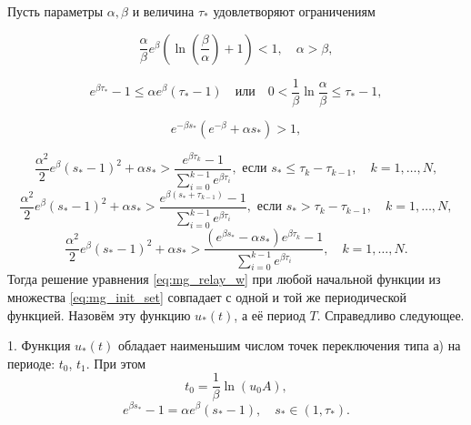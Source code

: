 \begin{theorem}
	\label{thm:mg_auxiliary_main}
	Пусть параметры $\alpha, \beta$ и величина $\tau_*$ удовлетворяют ограничениям
	
	\begin{equation}
		\label{eq:cond_thm1}
		\frac{\alpha}{\beta}e^{\beta}\left(\ln\left(\frac{\beta}{\alpha}\right)+1\right) < 1,
		\quad
		\alpha > \beta,
	\end{equation}
	
	\begin{equation}
		\label{eq:cond_thm2}
		e^{\beta \tau_*}-1 \leqslant \alpha e^\beta(\tau_*-1)
		\quad\text{или}\quad
		0 < \frac{1}{\beta}\ln\frac{\alpha}{\beta}\leqslant\tau_*-1,
	\end{equation}
	
	\begin{equation}
		\label{eq:cond_th_w>1_t_1+1}
		e^{-\beta s_*}(e^{-\beta}+\alpha s_*) > 1,
	\end{equation}
	
	\begin{equation}
		\label{eq:cond_hair_hair_01}
		\frac{\alpha^2}{2}e^\beta(s_*-1)^2+\alpha s_*>\frac{e^{\beta \tau_k}-1}{\sum_{i=0}^{k-1}e^{\beta \tau_i}},\text{ если } s_*\leqslant \tau_k-\tau_{k-1},\quad k=1,\ldots,N,
	\end{equation}
	\begin{equation}
		\label{eq:cond_hair_hair_02}
		\frac{\alpha^2}{2}e^\beta(s_*-1)^2+\alpha s_*>\frac{e^{\beta (s_*+\tau_{k-1})}-1}{\sum_{i=0}^{k-1}e^{\beta \tau_i}},\text{ если } s_* > \tau_k-\tau_{k-1},\quad k=1,\ldots,N,
	\end{equation}
	\begin{equation}
		\label{eq:cond_hair_hair_1}
		\frac{\alpha^2}{2}e^\beta( s_*-1)^2+\alpha s_*>\frac{(e^{\beta s_*}-\alpha s_*)e^{\beta \tau_k}-1}{\sum_{i=0}^{k-1}e^{\beta \tau_i}},\quad k=1,\ldots,N.
	\end{equation}
	Тогда решение уравнения \eqref{eq:mg_relay_w} при любой начальной функции из множества \eqref{eq:mg_init_set} совпадает с одной и той же периодической функцией. Назовём эту функцию $u_*(t)$, а её период $T$. Справедливо следующее.
	
	1. Функция $u_*(t)$ обладает наименьшим числом точек переключения типа а) на периоде: $t_0$, $t_1$. При этом 
	\begin{equation*}
		t_0=\frac{1}{\beta}\ln(u_0 A),
	\end{equation*}
	\begin{equation}
		e^{\beta s_*} - 1=\alpha e^{\beta}(s_* - 1), \quad s_* \in (1, \tau_*).
	\end{equation}
	

\end{theorem}
